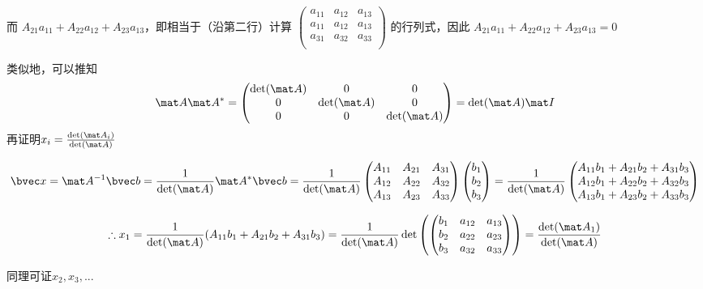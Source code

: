 而
$
A_{21}a_{11}+A_{22}a_{12}+A_{23}a_{13}
$，即相当于（沿第二行）计算
$
\begin{pmatrix}
a_{11}&a_{12}&a_{13}\\
a_{11}&a_{12}&a_{13}\\
a_{31}&a_{32}&a_{33}\\
\end{pmatrix}
$
的行列式，因此
$
A_{21}a_{11}+A_{22}a_{12}+A_{23}a_{13}=0
$

类似地，可以推知
\begin{equation}
\mat A \mat A^* =
\begin{pmatrix}
\det(\mat A)&0&0\\
0&\det(\mat A)&0\\
0&0&\det(\mat A)\\
\end{pmatrix}
=\det(\mat A) \mat I
\end{equation}
再证明$x_i=\frac{\det(\mat A_i)}{\det(\mat A)}$

$$
\bvec x = \mat A^{-1} \bvec b = \frac{1}{\det(\mat A)}\mat A^* \bvec b = 
\frac{1}{\det(\mat A)}
\begin{pmatrix}
A_{11}&A_{21}&A_{31}\\
A_{12}&A_{22}&A_{32}\\
A_{13}&A_{23}&A_{33}\\
\end{pmatrix}
\begin{pmatrix}
b_1\\
b_2\\
b_3\\
\end{pmatrix}
=
\frac{1}{\det(\mat A)}
\begin{pmatrix}
A_{11}b_1+A_{21}b_2+A_{31}b_3\\
A_{12}b_1+A_{22}b_2+A_{32}b_3\\
A_{13}b_1+A_{23}b_2+A_{33}b_3\\
\end{pmatrix}
$$

$$
\therefore x_1=\frac{1}{\det(\mat A)}(A_{11}b_1+A_{21}b_2+A_{31}b_3)
=\frac{1}{\det(\mat A)}\det\left(
\begin{pmatrix}
b_{1}&a_{12}&a_{13}\\
b_{2}&a_{22}&a_{23}\\
b_{3}&a_{32}&a_{33}\\
\end{pmatrix}
\right)
=\frac{\det(\mat A_1)}{\det(\mat A)}
$$

同理可证$x_2, x_3,...$
